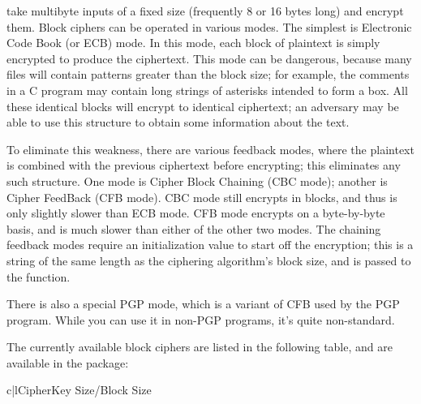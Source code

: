 \documentclass{howto}
\begin{document}
 take multibyte inputs of a fixed size
(frequently 8 or 16 bytes long) and encrypt them.  Block ciphers can
be operated in various modes.  The simplest is Electronic Code Book
(or ECB) mode.  In this mode, each block of plaintext is simply
encrypted to produce the ciphertext.  This mode can be dangerous,
because many files will contain patterns greater than the block size;
for example, the comments in a C program may contain long strings of
asterisks intended to form a box.  All these identical blocks will
encrypt to identical ciphertext; an adversary may be able to use this
structure to obtain some information about the text.

To eliminate this weakness, there are various feedback modes, where
the plaintext is combined with the previous ciphertext before
encrypting; this eliminates any such structure.  One mode is Cipher
Block Chaining (CBC mode); another is Cipher FeedBack (CFB
mode).   CBC mode still encrypts in blocks, and thus is only
slightly slower than ECB mode.  CFB mode encrypts on a byte-by-byte
basis, and is much slower than either of the other two modes.  The
chaining feedback modes require an initialization value to start off
the encryption; this is a string of the same length as the ciphering
algorithm's block size, and is passed to the  function.

There is also a special PGP mode, which is a variant
of CFB used by the PGP program.  While you can use it in non-PGP
programs, it's quite non-standard.

The currently available block ciphers are listed in the following table,
and are available in the  package:


\begin{tableii}{c|l}{}{Cipher}{Key Size/Block Size}
\end{tableii}
\end{document}
